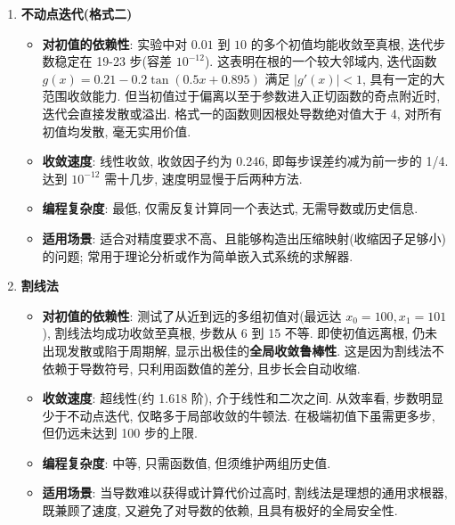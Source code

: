 \documentclass[zihao=-4,a4paper]{ctexart}
\begin{document}
\begin{enumerate}
    \item \textbf{不动点迭代(格式二)}
    \begin{itemize}[rightmargin=0.5cm]
        \item \textbf{对初值的依赖性}: 实验中对 $0.01$ 到 $10$ 的多个初值均能收敛至真根, 迭代步数稳定在 19-23 步(容差 $10^{-12}$). 这表明在根的一个较大邻域内, 迭代函数 $g(x)=0.21-0.2\tan(0.5x+0.895)$ 满足 $|g'(x)|<1$, 具有一定的大范围收敛能力. 但当初值过于偏离以至于参数进入正切函数的奇点附近时, 迭代会直接发散或溢出. 格式一的函数则因根处导数绝对值大于 4, 对所有初值均发散, 毫无实用价值. 
        \item \textbf{收敛速度}: 线性收敛, 收敛因子约为 0.246, 即每步误差约减为前一步的 1/4. 达到 $10^{-12}$ 需十几步, 速度明显慢于后两种方法. 
        \item \textbf{编程复杂度}: 最低, 仅需反复计算同一个表达式, 无需导数或历史信息. 
        \item \textbf{适用场景}: 适合对精度要求不高、且能够构造出压缩映射(收缩因子足够小)的问题; 常用于理论分析或作为简单嵌入式系统的求解器. 
    \end{itemize}
    
    \item \textbf{割线法}
    \begin{itemize}[rightmargin=0.5cm]
        \item \textbf{对初值的依赖性}: 测试了从近到远的多组初值对(最远达 $x_0=100, x_1=101$), 割线法均成功收敛至真根, 步数从 6 到 15 不等. 即使初值远离根, 仍未出现发散或陷于周期解, 显示出极佳的\textbf{全局收敛鲁棒性}. 这是因为割线法不依赖于导数符号, 只利用函数值的差分, 且步长会自动收缩. 
        \item \textbf{收敛速度}: 超线性(约 1.618 阶), 介于线性和二次之间. 从效率看, 步数明显少于不动点迭代, 仅略多于局部收敛的牛顿法. 在极端初值下虽需更多步, 但仍远未达到 100 步的上限. 
        \item \textbf{编程复杂度}: 中等, 只需函数值, 但须维护两组历史值. 
        \item \textbf{适用场景}: 当导数难以获得或计算代价过高时, 割线法是理想的通用求根器, 既兼顾了速度, 又避免了对导数的依赖, 且具有极好的全局安全性. 
    \end{itemize}
    

\end{enumerate}
\end{document}
